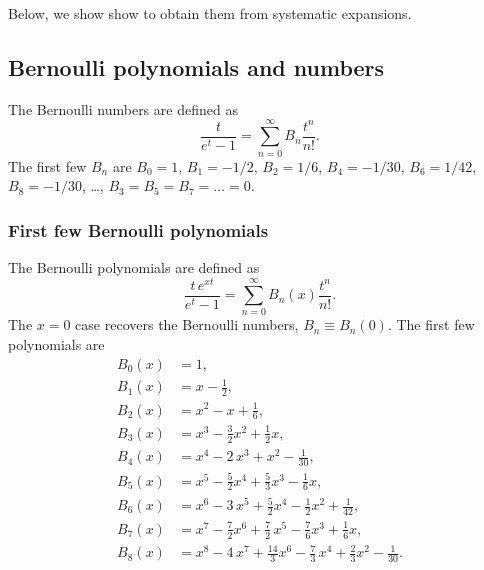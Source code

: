 \documentclass[aip,jcp,preprint,notitlepage, superscriptaddress]{revtex4-1}
\begin{document}
%
Below, we show show to obtain them from systematic expansions.







\subsection{Bernoulli polynomials and numbers}



The Bernoulli numbers are defined as
%
\begin{equation}
  \frac{ t }
  {e^t - 1}
=
\sum_{n = 0}^\infty
  B_n \frac{ t^n } { n! }.
\label{eq:Bernoulli_number}
\end{equation}
%
The first few $B_n$ are\cite{
  whittaker, arfken, abramowitz, wang_specfunc}
$B_0 = 1$,
$B_1 = -1/2$,
$B_2 = 1/6$,
$B_4 = -1/30$,
$B_6 = 1/42$,
$B_8 = -1/30$,
\dots,
$B_3 = B_5 = B_7 = \dots = 0$.



\subsubsection{First few Bernoulli polynomials}



The Bernoulli polynomials are defined as
%
\begin{equation}
  \frac{ t \, e^{x t} }
  {e^t - 1}
=
\sum_{n = 0}^\infty
  B_n(x) \frac{ t^n } { n! }.
\label{eq:Bernoulli_polynomial}
\end{equation}
%
The $x = 0$ case
recovers the Bernoulli numbers,
$B_n \equiv B_n(0)$.
%
The first few polynomials are\cite{
  whittaker, arfken, abramowitz, wang_specfunc}
\begin{align*}
B_0(x) &= 1, \\
B_1(x) &= x - \frac 1 2, \\
B_2(x) &= x^2 - x + \frac 1 6, \\
B_3(x) &= x^3 - \frac 3 2 x^2 + \frac 1 2 x, \\
B_4(x) &= x^4 - 2 \, x^3 + x^2 - \frac{1}{30}, \\
B_5(x) &= x^5 - \frac 5 2 x^4 + \frac 5 3 x^3 - \frac{1}{6} x, \\
B_6(x) &= x^6 - 3 \, x^5 + \frac 5 2 x^4 - \frac 1 2 x^2 + \frac{1}{42}, \\
B_7(x) &= x^7 - \frac 7 2 x^6 + \frac 7 2 \, x^5 - \frac 7 6 x^3 + \frac 1 6 x, \\
B_8(x) &= x^8 - 4 \, x^7 + \frac{14} 3 x^6 - \frac 7 3 \, x^4 + \frac 2 3 x^2 - \frac{1}{30}. \\
\end{align*}
\end{document}

